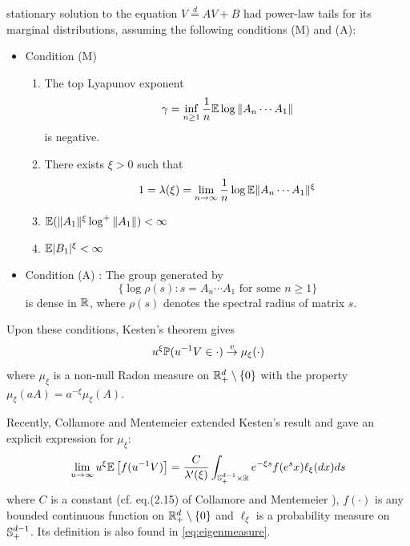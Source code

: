 stationary solution to the equation
$V \overset{d}{=} A V + B$ had power-law tails
for its marginal distributions, assuming the following conditions (M)
and (A):
\begin{itemize}
\item Condition (M)
  \begin{enumerate}
  \item The top Lyapunov exponent
    \[
    \gamma = \inf_{n \geq 1} {1 \over n}\mathbb{E} \log \|A_n \cdots A_1\|
    \]
    is negative.
  \item There exists $\xi > 0$ such that
    \[
    1 = \lambda(\xi) = \lim_{n \to \infty} {1 \over n} \log \mathbb{E} \|A_n \cdots A_1\|^\xi
    \]
  \item $\mathbb{E} (\|A_1\|^\xi \log^+\|A_1\|) < \infty$
  \item $\mathbb{E} |B_1|^\xi < \infty$
  \end{enumerate}
\item Condition (A) : The group generated by
  \[
  \{\log\rho(s): s = A_n \cdots A_1 \text{ for some } n \geq 1\}
  \]
  is dense in $\mathbb R$, where $\rho(s)$ denotes the spectral
  radius of matrix $s$.
\end{itemize}
Upon these conditions, Kesten's theorem gives
\begin{equation}
  \label{eq:kesten}
  u^\xi \P(u^{-1} V \in \cdot) \overset{v}{\to} \mu_\xi(\cdot)
\end{equation}
where $\mu_\xi$ is a non-null Radon measure on
$\mathbb R^d_+ \setminus \{0\}$ with the property
$\mu_\xi(a A) = a^{-\xi} \mu_\xi(A)$.

Recently, Collamore and Mentemeier \cite{collamore:mentemeier:2016}
extended Kesten's result and gave an explicit expression for $\mu_\xi$:
\begin{equation}
  \label{eq:CollamoreMentemeier}
  \lim_{u \to \infty} u^{\xi} \E \left[
    f(u^{-1} V)
    \right]
  =
  {C \over \lambda'(\xi)}  
  \int_{\sphere^{d-1}_+ \times \reals} e^{-\xi s} f(e^s x) \ell_\xi(dx) ds
\end{equation}
where $C$ is a constant (cf. eq.(2.15) of Collamore and Mentemeier
\cite{collamore:mentemeier:2016}), $f(\cdot)$ is any bounded
continuous function on $\mathbb R^{d}_+ \setminus \{0\}$  and
$\ell_\xi$ is a probability measure on $\mathbb S_+^{d-1}$. Its definition
is also found in \eqref{eq:eigenmeasure}.

